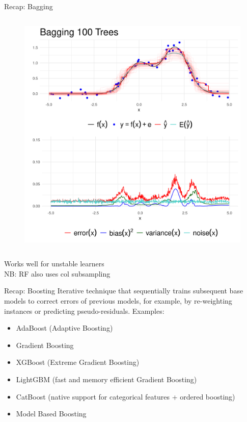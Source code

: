 \documentclass[10pt,compress,t,notes=noshow, xcolor=table]{beamer}
\begin{document}
\begin{vbframe}{Recap: Bagging}
\begin{columns}
\begin{column}{0.5\textwidth}
\begin{figure}
            \includegraphics{figure_man/bagging_variance_bias_100_trees.png}
            \label{fig:bagging_trees}
        \end{figure}
    \end{column}
\end{columns}
Works well for unstable learners\\
\vfill
NB: RF also uses col subsampling

\end{vbframe}


\begin{vbframe}{Recap: Boosting}
Iterative technique that sequentially trains subsequent base models to correct errors of previous models, for example, by re-weighting instances or predicting pseudo-residuals.
\vfill
Examples:
\begin{itemize}
    \item AdaBoost (Adaptive Boosting)
    \item Gradient Boosting
    \item XGBoost (Extreme Gradient Boosting)
    \item LightGBM (fast and memory efficient Gradient Boosting)
    \item CatBoost (native support for categorical features + ordered boosting)
    \item Model Based Boosting
\end{itemize}
\vfill
\end{vbframe}
\end{document}
